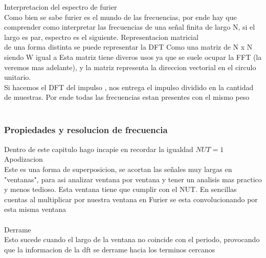 Interpretacion del espectro de furier\\
Como bien se sabe furier es el mundo de las frecuencias, por ende hay que comprender como interpretar las frecuencias de una señal finita de largo N, si el largo es par, espectro es el siguiente.
Representacion matricial\\ de una forma distinta se puede representar la DFT Como una matriz de N x N 
siendo W igual a
Esta matriz tiene diveros usos ya que se suele ocupar la FFT (la veremos mas adelante), y la matriz representa la direccion vectorial en el circulo unitario.
\\ Si hacemos el DFT del impulso , nos entrega el impulso dividido en la cantidad de muestras. Por ende todas las frecuencias estan presentes con el mismo peso\\\\
\subsubsection{Propiedades y resolucion de frecuencia}
Dentro de este capitulo hago incapie en recordar la igualdad $NUT=1$
\\ Apodizacion \\ Este es una forma de superposicion, se acortan las señales muy largas en "ventanas", para asi analizar ventana por ventana y tener un analisis mas practico y menos tedioso. Esta ventana tiene que cumplir con el NUT. En sencillas cuentas al multiplicar por nuestra ventana en Furier se esta convolucionando por esta misma ventana 
\\ \\Derrame \\ Esto sucede cuando el largo de la ventana no coincide con el periodo, provocando que la informacion de la dft se derrame hacia los terminos cercanos
